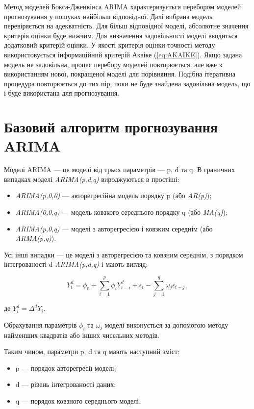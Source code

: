 \documentclass{thesis_utf8}
\begin{document}
Метод моделей Бокса-Дженкінса ARIMA характеризується перебором моделей прогнозування у пошуках найбільш відповідної. Далі вибрана модель перевіряється на адекватність. Для більш відповідної моделі, абсолютне значення критерія оцінки буде нижчим. Для визначення задовільності моделі вводиться додатковий критерій оцінки. У якості критерія оцінки точності методу використовується інформаційний критерій Акаіке \cite{book:akaike}  (\ref{eq:AKAIKE}). Якщо задана модель не задовільна, процес перебору моделей повторюється, але вже з використанням нової, покращеної моделі для порівняння. Подібна ітеративна процедура повторюється до тих пір, поки не буде знайдена задовільна модель, що і буде використана для прогнозування.

\section{Базовий алгоритм прогнозування ARIMA}

Моделі ARIMA --- це моделі від трьох параметрів --- p, d та q. В граничних випадках моделі \textit{ARIMA(p,d,q)} вироджуються в простіші:
\begin{itemize}
    \item \textit{ARIMA(p,0,0)} --- авторегресійна модель порядку p (або \textit{AR(p)});
    \item \textit{ARIMA(0,0,q)} --- модель ковзкого середнього порядку q (або \textit{MA(q)});
    \item \textit{ARIMA(p,0,q)} --- моделі з авторегресією і ковзким середнім (або \textit{ARMA(p,q)}).
\end{itemize}

Усі інші випадки --- це моделі з авторегресією та ковзним середнім, з порядком інтегрованості d \textit{ARIMA(p,d,q)} і мають вигляд:

\begin{equation}
    Y_{t}^{d} = \phi_{0} + \sum^{p}_{i=1}\phi_{i}Y_{t-i}^{d} +\epsilon_{t}  - \sum^{q}_{j=1}\omega_{j}\epsilon_{t-j},
\end{equation}

де $Y_{i}^{d} = \Delta^{d}Y_{i}$.

Обрахування параметрів $\phi_{i}$ та $\omega_{j}$ моделі виконується за допомогою методу найменших квадратів або інших чисельних методів.

Таким чином, параметри p, d та q мають наступний зміст:
\begin{itemize}
    \item p --- порядок авторегресії моделі;
    \item d --- рівень інтегрованості даних;
    \item q --- порядок ковзного середнього моделі.
\end{itemize}
\end{document}
